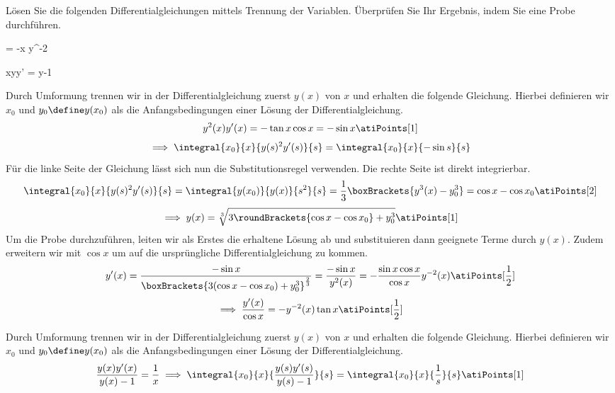 \begin{atiTask}[
	title = Zwei separable Differentialgleichungen,
	language = Deutsch
]
	Lösen Sie die folgenden Differentialgleichungen mittels Trennung der Variablen.
	Überprüfen Sie Ihr Ergebnis, indem Sie eine Probe durchführen.
	\begin{atiSubequations}
		\item{
			 = -\tan x \cdot y^{-2}
		}
		\item{
			xyy' = y-1
		}
	\end{atiSubequations}
\end{atiTask}
\begin{atiSolution}
	\begin{atiSubtaskSolutions}
		\item[\localref{dgl1}]{
			Durch Umformung trennen wir in der Differentialgleichung zuerst $y(x)$ von $x$ und erhalten die folgende Gleichung.
			Hierbei definieren wir $x_0$ und $y_0\define y(x_0)$ als die Anfangsbedingungen einer Lösung der Differentialgleichung.
			\[
				y^2(x)y'(x) = -\tan x \cos x = -\sin x\atiPoints[1]
			\]
			\[
				\implies \integral{x_0}{x}{y(s)^2y'(s)}{s} = \integral{x_0}{x}{-\sin s}{s}
			\]
			Für die linke Seite der Gleichung lässt sich nun die Substitutionsregel verwenden.
			Die rechte Seite ist direkt integrierbar.
			\[
				\integral{x_0}{x}{y(s)^2y'(s)}{s} = \integral{y(x_0)}{y(x)}{s^2}{s} = \frac{1}{3}\boxBrackets{y^3(x)-y^3_0} = \cos x - \cos x_0\atiPoints[2]
			\]
			\[
				\implies y(x) = \sqrt[3]{3\roundBrackets{\cos x - \cos x_0} + y_0^3}\atiPoints[1]
			\]
			Um die Probe durchzuführen, leiten wir als Erstes die erhaltene Lösung ab und substituieren dann geeignete Terme durch $y(x)$.
			Zudem erweitern wir mit $\cos x$ um auf die ursprüngliche Differentialgleichung zu kommen.
			\[
				y'(x) = \frac{-\sin x}{
					\boxBrackets{
						3(\cos x - \cos x_0) + y_0^3
					}^\frac{2}{3}
				} = \frac{-\sin x}{y^2(x)} = -\frac{\sin x \cos x}{\cos x}y^{-2}(x)\atiPoints[\frac{1}{2}]
			\]
			\[
				\implies \frac{y'(x)}{\cos x} = -y^{-2}(x)\tan x\atiPoints[\frac{1}{2}]
			\]
		}
		\item[\localref{dgl2}]{
			Durch Umformung trennen wir in der Differentialgleichung zuerst $y(x)$ von $x$ und erhalten die folgende Gleichung.
			Hierbei definieren wir $x_0$ und $y_0\define y(x_0)$ als die Anfangsbedingungen einer Lösung der Differentialgleichung.
			\[
				\frac{y(x)y'(x)}{y(x)-1} = \frac{1}{x} \implies \integral{x_0}{x}{\frac{y(s)y'(s)}{y(s)-1}}{s} = \integral{x_0}{x}{\frac{1}{s}}{s} \atiPoints[1]
\]}
\end{atiSubtaskSolutions}
\end{atiSolution}
